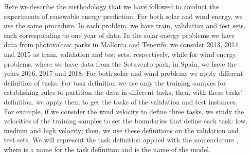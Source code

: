 %
\begin{table}[t!]
    \caption{Hyperparameters, grids used to find them (when appropriate), and hyperparameter selection method for each model. Here, $d$ is the number of {dimensions} %
     of the data and $\sigma$ is the standard deviation of the~target.}
    \label{tab:hyperpars_grid_energies}
    \centering
\end{table}

Here we describe the methodology that we have followed to conduct the experiments of renewable energy prediction.
%
For both solar and wind energy, we use the same procedure. In each problem, we have train, validation and test sets, each corresponding to one year of data. In the solar energy problems we have data from photovoltaic parks in Mallorca and Tenerife, we consider 2013, 2014 and 2015 as train, validation and test sets, respectively, while for wind energy problems, where we have data from the Sotavento park, in Spain, we have the years 2016, 2017 and 2018.
%
For both solar and wind problems we apply different definition of tasks. For task definition we use only the training samples for establishing rules to partition the data in different tasks; then, with these tasks' definition, we apply them to get the tasks of the validation and test instances.
%
For example, if we consider the wind velocity to define three tasks, we study the velocities of the training samples to set the boundaries that define each task: low, medium and high velocity; then, we use these definitions on the validation and test sets.
%
We will represent the task definition applied with the nomenclature , where  is a name for the task definition and  is the name of the model.

